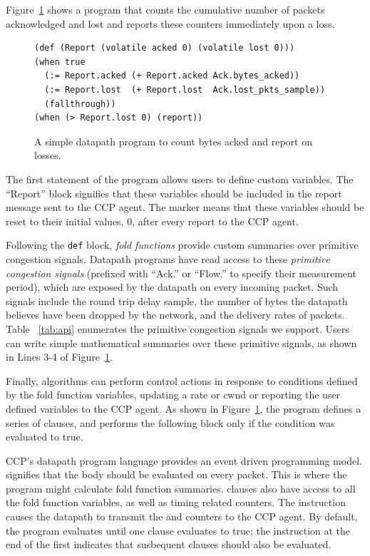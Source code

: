 Figure~\ref{lst:design:simple_datapath_prog} shows a program that counts the cumulative number of packets acknowledged and lost and reports these counters immediately upon a loss.
\begin{figure}[t]
{\footnotesize
\begin{verbatim}
(def (Report (volatile acked 0) (volatile lost 0)))
(when true
  (:= Report.acked (+ Report.acked Ack.bytes_acked))
  (:= Report.lost  (+ Report.lost  Ack.lost_pkts_sample))
  (fallthrough))
(when (> Report.lost 0) (report))
\end{verbatim}
\caption{A simple datapath program to count bytes acked and report on losses.} \label{lst:design:simple_datapath_prog}
}
\end{figure}
The first statement of the program allows users to define custom variables.
The ``Report'' block signifies that these variables should be included in the report message sent to the CCP agent.
The  marker means that these variables should be reset to their initial values, 0, after every report to the CCP agent.

Following the \texttt{def} block, \textit{fold functions} provide custom summaries over primitive congestion signals.
Datapath programs have read access to these \textit{primitive congestion signals} (prefixed with ``Ack.'' or ``Flow.'' to specify their measurement period), which are exposed by the datapath on every incoming packet. Such signals include the round trip delay sample, the number of bytes the datapath believes have been dropped by the network, and the delivery rates of packets. Table ~\ref{tab:api} enumerates the primitive congestion signals we support.
Users can write simple mathematical summaries over these primitive signals, as shown in Lines 3-4 of Figure~\ref{lst:design:simple_datapath_prog}.

Finally, algorithms can perform control actions in response to conditions defined by the fold function variables, \eg updating a rate or cwnd or reporting the user defined variables to the CCP agent.
As shown in Figure~\ref{lst:design:simple_datapath_prog}, the program defines a series of  clauses, and performs the following block only if the condition was evaluated to true.

CCP's datapath program language provides an event driven programming model.
 signifies that the body should be evaluated on every packet.
This is where the program might calculate fold function summaries.
 clauses also have access to all the fold function variables, as well as timing related counters.
The  instruction causes the datapath to transmit the  and  counters to the CCP agent.
By default, the program evaluates until one  clause evaluates to true; the  instruction at the end of the first  indicates that susbequent  clauses should also be evaluated.

